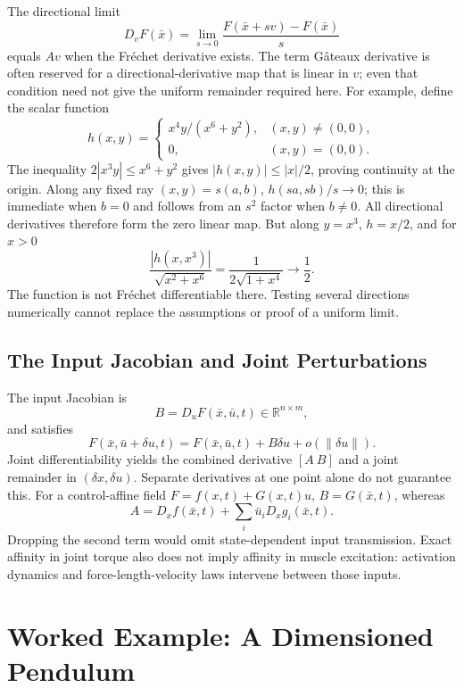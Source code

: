 The directional limit
\begin{equation}
D_vF(\bar x)=\lim_{s\to0}\frac{F(\bar x+sv)-F(\bar x)}{s}
\label{eq:ch1:gateaux}
\end{equation}
equals $Av$ when the Fréchet derivative exists. The term Gâteaux derivative is often
reserved for a directional-derivative map that is linear in $v$; even that condition need
not give the uniform remainder required here. For example, define the scalar function
\[
h(x,y)=\begin{cases}x^4y/(x^6+y^2),&(x,y)\ne(0,0),\\0,&(x,y)=(0,0).
\end{cases}
\]
The inequality $2|x^3y|\leq x^6+y^2$ gives $|h(x,y)|\leq|x|/2$, proving continuity
at the origin. Along any fixed ray $(x,y)=s(a,b)$, $h(sa,sb)/s\to0$; this is immediate
when $b=0$ and follows from an $s^2$ factor when $b\ne0$. All directional derivatives
therefore form the zero linear map. But along $y=x^3$, $h=x/2$, and for $x>0$
\[
\frac{|h(x,x^3)|}{\sqrt{x^2+x^6}}=\frac{1}{2\sqrt{1+x^4}}\longrightarrow\frac12.
\]
The function is not Fréchet differentiable there. Testing several directions numerically
cannot replace the assumptions or proof of a uniform limit.

\subsection{The Input Jacobian and Joint Perturbations}

The input Jacobian is
\begin{equation}
B=D_uF(\bar x,\bar u,t)\in\mathbb R^{n\times m},
\label{eq:ch1:jacobian-B}
\end{equation}
and satisfies
\begin{equation}
F(\bar x,\bar u+\delta u,t)=F(\bar x,\bar u,t)+B\delta u+o(\|\delta u\|).
\label{eq:ch1:frechet-u}
\end{equation}
Joint differentiability yields the combined derivative $[A\ B]$ and a joint remainder in
$(\delta x,\delta u)$. Separate derivatives at one point alone do not guarantee this.
For a control-affine field $F=f(x,t)+G(x,t)u$, $B=G(\bar x,t)$, whereas
\[
A=D_xf(\bar x,t)+\sum_i\bar u_iD_xg_i(\bar x,t).
\]
Dropping the second term would omit state-dependent input transmission. Exact affinity in
joint torque also does not imply affinity in muscle excitation: activation dynamics and
force-length-velocity laws intervene between those inputs.

\section{Worked Example: A Dimensioned Pendulum}

